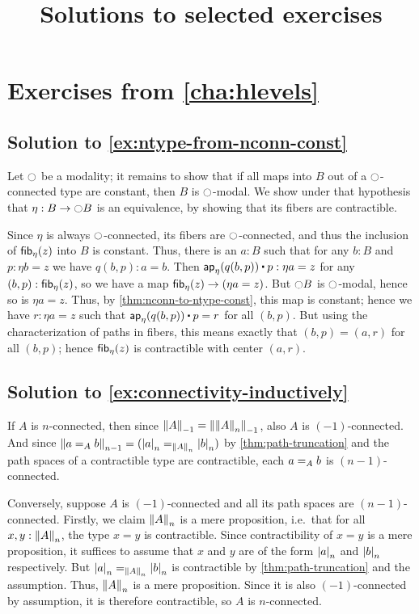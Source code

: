 \documentclass[
%
%
11pt %
]{article}
\title{Solutions to selected exercises}
\begin{document}
\maketitle

\section*{Exercises from \autoref{cha:hlevels}}

\subsection*{Solution to \autoref{ex:ntype-from-nconn-const}}

Let $\modal$ be a modality; it remains to show that if all maps into $B$ out of a $\modal$-connected type are constant, then $B$ is $\modal$-modal.
We show under that hypothesis that $\eta:B\to \modal B$ is an equivalence, by showing that its fibers are contractible.

Since $\eta$ is always $\modal$-connected, its fibers are $\modal$-connected, and thus the inclusion of $\hfib{\eta}{z}$ into $B$ is constant.
Thus, there is an $a:B$ such that for any $b:B$ and $p:\eta b=z$ we have $q(b,p):a=b$.
Then $\apfunc{\eta}(q(b,p))\ct p : \eta a=z$ for any $(b,p):\hfib\eta z$, so we have a map $\hfib\eta z \to (\eta a=z)$.
But $\modal B$ is $\modal$-modal, hence so is $\eta a = z$.
Thus, by \autoref{thm:nconn-to-ntype-const}, this map is constant; hence we have $r:\eta a=z$ such that $\apfunc{\eta}(q(b,p))\ct p = r$ for all $(b,p)$.
But using the characterization of paths in fibers, this means exactly that $(b,p)=(a,r)$ for all $(b,p)$; hence $\hfib\eta z$ is contractible with center $(a,r)$.

\subsection*{Solution to \autoref{ex:connectivity-inductively}}

If $A$ is $n$-connected, then since $\trunc{-1}A = \trunc{-1}{\trunc{n}A}$, also $A$ is $(-1)$-connected.
And since $\trunc{n-1}{\id[A]ab} = (\id[\trunc n A]{\tproj na}{\tproj nb})$ by \autoref{thm:path-truncation} and the path spaces of a contractible type are contractible, each $\id[A]ab$ is $(n-1)$-connected.

Conversely, suppose $A$ is $(-1)$-connected and all its path spaces are $(n-1)$-connected.
Firstly, we claim $\trunc nA$ is a mere proposition, i.e.\ that for all $x,y:\trunc nA$, the type $x=y$ is contractible.
Since contractibility of $x=y$ is a mere proposition, it suffices to assume that $x$ and $y$ are of the form $\tproj na$ and $\tproj nb$ respectively.
But $\id[\trunc n A]{\tproj na}{\tproj nb}$ is contractible by \autoref{thm:path-truncation} and the assumption.
Thus, $\trunc nA$ is a mere proposition.
Since it is also $(-1)$-connected by assumption, it is therefore contractible, so $A$ is $n$-connected.
\end{document}
